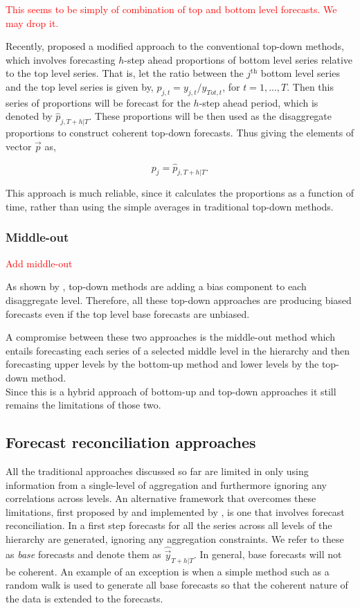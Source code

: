 \documentclass[graybox]{svmult}
\begin{document}
\textcolor{red}{This seems to be simply of combination of top and bottom level forecasts. We may drop it. }

Recently, \cite{Mircetic2017} proposed a modified approach to the conventional top-down methods, which involves forecasting $h$-step ahead proportions of bottom level series relative to the top level series. That is, let the ratio between the $j^\text{th}$ bottom level series and the top level series is given by, $p_{j,t}=y_{j,t}/y_{Tot,t}$, for $t=1,...,T$. Then this series of proportions will be forecast for the $h$-step ahead period, which is denoted by $\hat{p}_{j,T+h|T}$. These proportions will be then used as the disaggregate proportions to construct coherent top-down forecasts. Thus giving the elements of vector $\vec{p}$ as,

\begin{equation}
p_j = \hat{p}_{j,T+h|T}.
\end{equation}

This approach is much reliable, since it calculates the proportions as a function of time, rather than using the simple averages in traditional top-down methods.

\subsubsection{Middle-out}
\textcolor{red}{Add middle-out}

As shown by \cite{HynEtAl2011}, top-down methods are adding a bias component to each disaggregate level. Therefore, all these top-down approaches are producing biased forecasts even if the top level base forecasts are unbiased.

A compromise between these two approaches is the middle-out method which entails forecasting each series of a selected middle level in the hierarchy and then forecasting upper levels by the bottom-up method and lower levels by the top-down method.\\
Since this is a hybrid approach of bottom-up and top-down approaches it still remains the limitations of those two.

\subsection{Forecast reconciliation approaches}\label{sec:reconciliation approaches}

All the traditional approaches discussed so far are limited in only using information from a single-level of aggregation and furthermore ignoring any correlations across levels. An alternative framework that overcomes these limitations, first proposed by \citet{HynEtAl2011} and implemented by \citet{AthEtAl2009}, is one that involves forecast reconciliation. In a first step forecasts for all the series across all levels of the hierarchy are generated, ignoring any aggregation constraints. We refer to these as \textit{base} forecasts and denote them as $\hat{\vec{y}}_{T+h|T}$. In general, base forecasts will not be coherent. An example of an exception is when a simple method such as a random walk is used to generate all base forecasts so that the coherent nature of the data is extended to the forecasts.
\end{document}
